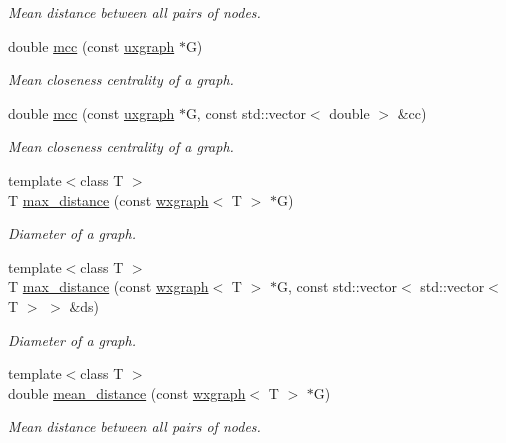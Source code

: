 \begin{DoxyCompactItemize}
\begin{DoxyCompactList}\small\item\em Mean distance between all pairs of nodes. \end{DoxyCompactList}\item 
double \hyperlink{namespacelgraph_1_1networks_1_1metrics_1_1distance_a29f1194ca5bd104ae062792a6df1c401}{mcc} (const \hyperlink{classlgraph_1_1uxgraph}{uxgraph} $\ast$G)
\begin{DoxyCompactList}\small\item\em Mean closeness centrality of a graph. \end{DoxyCompactList}\item 
double \hyperlink{namespacelgraph_1_1networks_1_1metrics_1_1distance_a80312d952679dca4ec5249298f12d156}{mcc} (const \hyperlink{classlgraph_1_1uxgraph}{uxgraph} $\ast$G, const std\+::vector$<$ double $>$ \&cc)
\begin{DoxyCompactList}\small\item\em Mean closeness centrality of a graph. \end{DoxyCompactList}\item 
{\footnotesize template$<$class T $>$ }\\T \hyperlink{namespacelgraph_1_1networks_1_1metrics_1_1distance_ab497d212293a672c1b511f3e9224603d}{max\+\_\+distance} (const \hyperlink{classlgraph_1_1wxgraph}{wxgraph}$<$ T $>$ $\ast$G)
\begin{DoxyCompactList}\small\item\em Diameter of a graph. \end{DoxyCompactList}\item 
{\footnotesize template$<$class T $>$ }\\T \hyperlink{namespacelgraph_1_1networks_1_1metrics_1_1distance_ab8e7a10f4ecd1e1babf463b151027fa5}{max\+\_\+distance} (const \hyperlink{classlgraph_1_1wxgraph}{wxgraph}$<$ T $>$ $\ast$G, const std\+::vector$<$ std\+::vector$<$ T $>$ $>$ \&ds)
\begin{DoxyCompactList}\small\item\em Diameter of a graph. \end{DoxyCompactList}\item 
{\footnotesize template$<$class T $>$ }\\double \hyperlink{namespacelgraph_1_1networks_1_1metrics_1_1distance_a17eab7f8ea3692a6f531219ebd567a2f}{mean\+\_\+distance} (const \hyperlink{classlgraph_1_1wxgraph}{wxgraph}$<$ T $>$ $\ast$G)
\begin{DoxyCompactList}\small\item\em Mean distance between all pairs of nodes. \end{DoxyCompactList}\item 

\end{DoxyCompactItemize}
